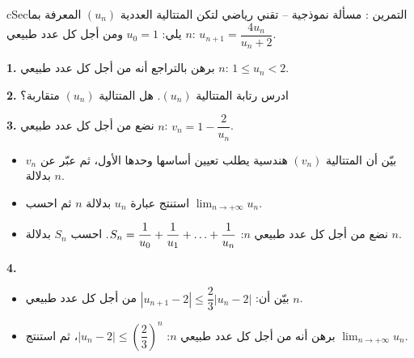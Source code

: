 \documentclass[12pt,a4paper]{article}
\newenvironment{BOX}[2]{\begin{otherlanguage}{english}\begin{arbox}{#1}{#2}}{\end{arbox}\end{otherlanguage}}
\newcounter{exo}
\newenvironment{tamrin}[1]{\stepcounter{exo}\begin{BOX}{cSec}{التمرين \theexo: #1}}{\end{BOX}}
\renewcommand{\dots}{\mathinner{\ldotp\ldotp\ldotp}}
\newcommand{\limn}{\displaystyle\lim_{n\to+\infty}}
\newenvironment{sq}{\begin{itemize}[leftmargin=2.4em,itemsep=3pt]}{\end{itemize}}
\newcommand{\qa}{\item[(أ)]}\newcommand{\qb}{\item[(ب)]}\newcommand{\qc}{\item[(جـ)]}\newcommand{\qd}{\item[(د)]}\newcommand{\qe}{\item[(هـ)]}
\newcommand{\QQ}[1]{\par\smallskip\textbf{#1.} }
\begin{document}
\begin{tamrin}{مسألة نموذجية -- تقني رياضي}
لتكن المتتالية العددية $(u_n)$ المعرفة بما يلي: $u_0=1$ ومن أجل كل عدد طبيعي $n$: $u_{n+1}=\dfrac{4u_n}{u_n+2}$.

\QQ{1} برهن بالتراجع أنه من أجل كل عدد طبيعي $n$: $1\le u_n<2$.

\QQ{2} ادرس رتابة المتتالية $(u_n)$. هل المتتالية $(u_n)$ متقاربة؟

\QQ{3} نضع من أجل كل عدد طبيعي $n$: $v_n=1-\dfrac{2}{u_n}$.
\begin{sq}
\qa بيّن أن المتتالية $(v_n)$ هندسية يطلب تعيين أساسها وحدها الأول، ثم عبّر عن $v_n$ بدلالة $n$.
\qb استنتج عبارة $u_n$ بدلالة $n$ ثم احسب $\limn u_n$.
\qc نضع من أجل كل عدد طبيعي $n$: $S_n=\dfrac1{u_0}+\dfrac1{u_1}+\dots+\dfrac1{u_n}$. احسب $S_n$ بدلالة $n$.
\end{sq}
\QQ{4}
\begin{sq}
\qa بيّن أن: $|u_{n+1}-2|\le\dfrac23|u_n-2|$ من أجل كل عدد طبيعي $n$.
\qb برهن أنه من أجل كل عدد طبيعي $n$: $|u_n-2|\le\left(\dfrac23\right)^n$، ثم استنتج $\limn u_n$.
\end{sq}
\end{tamrin}
\end{document}
